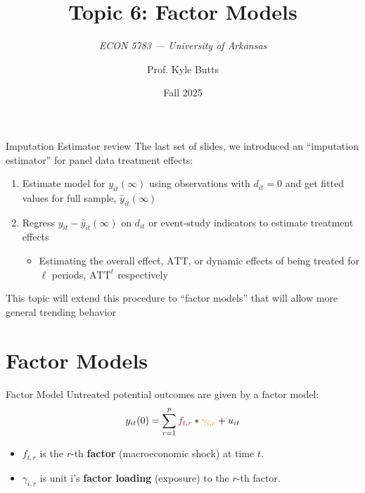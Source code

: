 \documentclass[aspectratio=169,t,11pt,table]{beamer}
\title{Topic 6: Factor Models}
\subtitle{\it  ECON 5783 — University of Arkansas}
\date{Fall 2025}
\author{Prof. Kyle Butts}
\begin{document}
\begin{frame}
\maketitle

\end{frame}

\begin{frame}{Imputation Estimator review}
  The last set of slides, we introduced an ``imputation estimator'' for panel data treatment effects:

  \begin{enumerate}
    \item Estimate model for $y_{it}(\infty)$ using observations with $d_{it} = 0$ and get fitted values for full sample, $\hat{y}_{it}(\infty)$
    
    \item Regress $y_{it} - \hat{y}_{it}(\infty)$ on $d_{it}$ or event-study indicators to estimate treatment effects
    \begin{itemize}
      \item Estimating the overall effect, $\text{ATT}$, or dynamic effects of being treated for $\ell$ periods, $\text{ATT}^\ell$ respectively
    \end{itemize}
  \end{enumerate}
  
  \pause
  \bigskip
  This topic will extend this procedure to ``factor models'' that will allow more general trending behavior
\end{frame}

\section{Factor Models}

\begin{frame}{Factor Model}
  Untreated potential outcomes are given by a factor model:
  $$
    y_{it}(0) = \sum_{r = 1}^{p} {\color{purple}f_{t,r}} * {\color{orange}\gamma_{i,r}} + u_{it}
  $$

  \begin{itemize}
    \item $f_{t, r}$ is the $r$-th \textbf{\color{purple} factor} (macroeconomic shock) at time $t$.
    \item $\gamma_{i,r}$ is unit i's \textbf{\color{orange} factor loading} (exposure) to the $r$-th factor.
  \end{itemize}
\end{frame}
\end{document}
